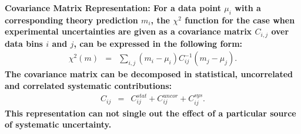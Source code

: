 \begin{description}
\item \bf {Covariance Matrix Representation:} \rm
For a data point  $\mu_i$ with a corresponding theory prediction $m_i$, the $\chi^2$ function for the case when experimental uncertainties are given as 
a covariance matrix $C_{i,j}$ over data bins $i$ and $j$, can be expressed in the following form:
%
\begin{eqnarray}
\chi^2 (m)& = & \sum_{i,j}(m_i-\mu_i)C^{-1}_{ij}(m_j-\mu_j).
\end{eqnarray}
The covariance matrix can be decomposed in statistical, uncorrelated and correlated systematic contributions: 
\begin{eqnarray}
C_{ij}& = & C^{stat}_{ij}+C^{uncor}_{ij}+C^{sys}_{ij}.
\end{eqnarray}
This representation can not single out the effect of a particular
source of systematic uncertainty.


\end{description}
